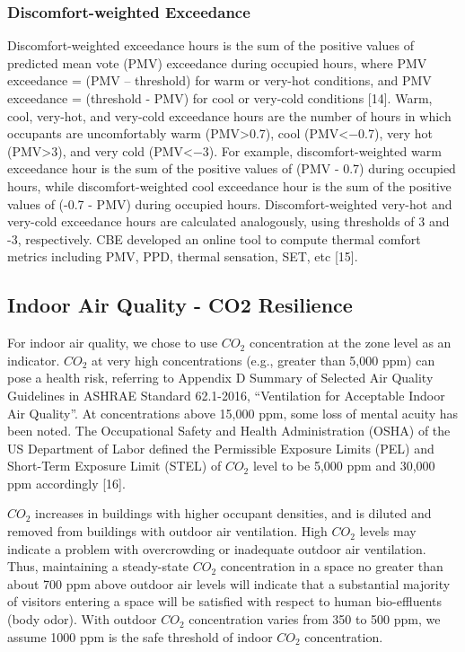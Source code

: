 \subsubsection{Discomfort-weighted
Exceedance}\label{discomfort-weighted-exceedance}

Discomfort-weighted exceedance hours is the sum of the positive values of
predicted mean vote (PMV) exceedance during occupied hours, where PMV exceedance
= (PMV – threshold) for warm or very-hot conditions, and PMV exceedance =
(threshold - PMV) for cool or very-cold conditions [14]. Warm, cool, very-hot,
and very-cold exceedance hours are the number of hours in which occupants are
uncomfortably warm (PMV>0.7), cool (PMV<−0.7), very hot (PMV>3), and very cold
(PMV<−3). For example, discomfort-weighted warm exceedance hour is the sum of
the positive values of (PMV - 0.7) during occupied hours, while
discomfort-weighted cool exceedance hour is the sum of the positive values of
(-0.7 - PMV) during occupied hours. Discomfort-weighted very-hot and very-cold
exceedance hours are calculated analogously, using thresholds of 3 and -3,
respectively. CBE developed an online tool to compute thermal comfort metrics
including PMV, PPD, thermal sensation, SET, etc [15].

\subsection{Indoor Air Quality - CO2
Resilience}\label{indoor-air-quality-resilience}

For indoor air quality, we chose to use $CO_2$ concentration at the zone level
as an indicator. $CO_2$ at very high concentrations (e.g., greater than 5,000
ppm) can pose a health risk, referring to Appendix D Summary of Selected Air
Quality Guidelines in ASHRAE Standard 62.1-2016, ``Ventilation for Acceptable
Indoor Air Quality''. At concentrations above 15,000 ppm, some loss of mental
acuity has been noted. The Occupational Safety and Health Administration (OSHA)
of the US Department of Labor defined the Permissible Exposure Limits (PEL) and
Short-Term Exposure Limit (STEL) of $CO_2$ level to be 5,000 ppm and 30,000 ppm
accordingly [16].

$CO_2$ increases in buildings with higher occupant densities, and is diluted and
removed from buildings with outdoor air ventilation. High $CO_2$ levels may
indicate a problem with overcrowding or inadequate outdoor air ventilation.
Thus, maintaining a steady-state $CO_2$ concentration in a space no greater than
about 700 ppm above outdoor air levels will indicate that a substantial majority
of visitors entering a space will be satisfied with respect to human
bio-effluents (body odor). With outdoor $CO_2$ concentration varies from 350 to
500 ppm, we assume 1000 ppm is the safe threshold of indoor $CO_2$
concentration.

